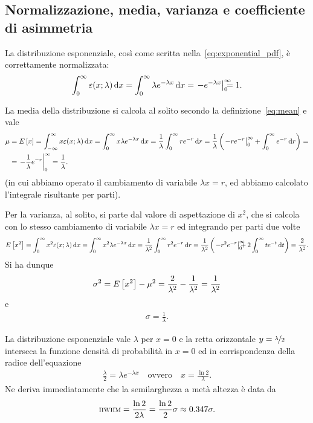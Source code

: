 \subsection{Normalizzazione, media, varianza e coefficiente di asimmetria}

La distribuzione esponenziale, così come scritta
nella~\eqref{eq:exponential_pdf}, è correttamente normalizzata:
\begin{align*}
\int_0^\infty \exponentialpdf[\lambda]{x} \diff =
\int_0^\infty \lambda e^{-\lambda x} \diff =
\eval{-e^{-\lambda x}}{0}{\infty} = 1.
\end{align*}

La media della distribuzione si calcola al solito secondo la
definizione~\ref{eq:mean} e vale
\begin{align}
  \mu & = \expect{x} =
  \int_{-\infty}^\infty x \exponentialpdf[\lambda]{x} \diff =
  \int_0^\infty x \lambda e^{-\lambda x} \diff =
  \frac{1}{\lambda} \int_0^\infty r e^{-r}\diff[r] =
  \frac{1}{\lambda} \left(
  \eval{-r e^{-r}}{0}{\infty} \;\;\; +
  \int_0^\infty e^{-r}\diff[r]
  \right) = \nonumber\\
  & = \eval{-\frac{1}{\lambda}e^{-r}}{0}{\infty} \;\;\; = \frac{1}{\lambda}.
\end{align}
(in cui abbiamo operato il cambiamento di variabile $\lambda x = r$, ed
abbiamo calcolato l'integrale risultante per parti).

Per la varianza, al solito, si parte dal valore di aspettazione di $x^2$,
che si calcola con lo stesso cambiamento di variabile $\lambda x = r$ ed
integrando per parti due volte
\begin{align*}
  \expect{x^2} =
  \int_0^\infty x^2 \exponentialpdf[\lambda]{x} \diff =
  \int_0^\infty x^2 \lambda e^{-\lambda x} \diff =
  \frac{1}{\lambda^2} \int_0^\infty r^2 e^{-r}\diff[r] =
  \frac{1}{\lambda^2}\left(
  \eval{-r^2 e^{-r}}{0}{\infty} +
  2\int_0^\infty t e^{-t}\diff[t]
  \right) = \frac{2}{\lambda^2}.
\end{align*}
Si ha dunque
\begin{align}
  \sigma^2 = \displaystyle E\left[x^2\right] - \mu^2 = \frac{2}{\lambda^2} - \frac{1}{\lambda^2} =
  \frac{1}{\lambda^2}
\end{align}
e
\begin{align}
  \sigma = \frac{1}{\lambda}.
\end{align}

La distribuzione esponenziale vale $\lambda$ per $x = 0$ e la retta orizzontale
$y = \nicefrac{\lambda}{2}$ interseca la funzione densità di probabilità
in $x = 0$ ed in corrispondenza della radice dell'equazione
\begin{align*}
  \frac{\lambda}{2} = \lambda e^{-\lambda x} \quad \text{ovvero} \quad
  x = \frac{\ln 2}{\lambda}.
\end{align*}
Ne deriva immediatamente che la semilarghezza a metà altezza è data da
\begin{align}
  {\scriptstyle \textsc{HWHM}} = \frac{\ln 2}{2\lambda} = \frac{\ln 2}{2}\sigma \approx 0.347\sigma.
\end{align}

